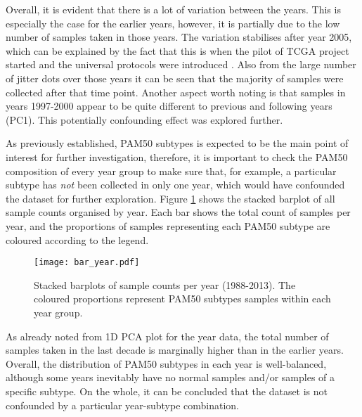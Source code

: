    Overall, it is evident that there is a lot of variation between the years. This is especially the case for the earlier years, however, it is partially due to the low number of samples taken in those years.  The variation stabilises after year 2005, which can be explained by the fact that this is when the pilot of TCGA project started and the universal protocols were introduced \cite{OverviewTCGA}. Also from the large number of jitter dots over those years it can be seen that the majority of samples were collected after that time point. Another aspect worth noting is that samples in years 1997-2000 appear to be quite different to previous and following years (PC1). This potentially confounding effect was explored further. \\
    \newline
    
    \newpage
    As previously established, PAM50 subtypes is expected to be the main point of interest for further investigation, therefore, it is important to check the PAM50 composition of every year group to make sure that, for example, a particular subtype has \textit{not} been collected in only one year, which would have confounded the dataset for further exploration. Figure \ref{fig:baryear} shows the stacked barplot of all sample counts organised by year. Each bar shows the total count of samples per year, and the proportions of samples representing each PAM50 subtype are coloured according to the legend. \\
    \newline
    
    
            \begin{figure}[!h]
            \centering
            \texttt{[image: bar\_year.pdf]}
            \caption[Stacked barplots of sample counts per year]{Stacked barplots of sample counts per year (1988-2013). The coloured proportions represent PAM50 subtypes samples within each year group. }
            \label{fig:baryear}
            \end{figure}
    
    As already noted from 1D PCA plot for the year data, the total number of samples taken in the last decade is marginally higher than in the earlier years. Overall, the distribution of PAM50 subtypes in each year is well-balanced,  although some years inevitably have no normal samples and/or samples of a specific subtype. On the whole, it can be concluded that the dataset is not confounded by a particular year-subtype combination.  
    
